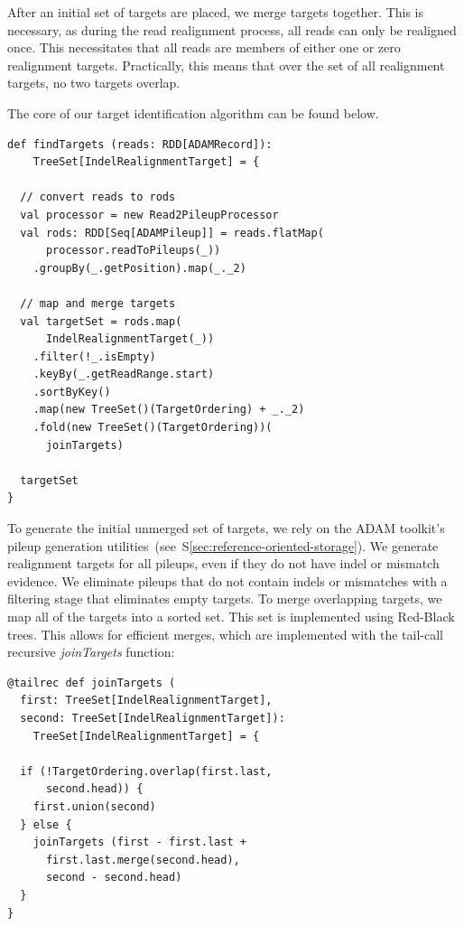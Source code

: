 \documentclass{acm_proc_article-sp}
\begin{document}
After an initial set of targets are placed, we merge targets together. This is necessary, as during the read realignment process, all
reads can only be realigned once. This necessitates that all reads are members of either one or zero realignment targets. Practically,
this means that over the set of all realignment targets, no two targets overlap.

The core of our target identification algorithm can be found below.

\begin{lstlisting}
def findTargets (reads: RDD[ADAMRecord]):
    TreeSet[IndelRealignmentTarget] = {

  // convert reads to rods
  val processor = new Read2PileupProcessor
  val rods: RDD[Seq[ADAMPileup]] = reads.flatMap(
      processor.readToPileups(_))
    .groupBy(_.getPosition).map(_._2)

  // map and merge targets
  val targetSet = rods.map(
      IndelRealignmentTarget(_))
    .filter(!_.isEmpty)
    .keyBy(_.getReadRange.start)
    .sortByKey()
    .map(new TreeSet()(TargetOrdering) + _._2)
    .fold(new TreeSet()(TargetOrdering))(
      joinTargets)

  targetSet
}
\end{lstlisting}

To generate the initial unmerged set of targets, we rely on the ADAM toolkit's pileup generation utilities~(see~\-S\ref{sec:reference-oriented-storage}).
We generate realignment targets for all pileups, even if they do not have indel or mismatch evidence. We eliminate pileups that do not contain indels
or mismatches with a filtering stage that eliminates empty targets. To merge overlapping targets, we map all of the targets into a sorted set. This set
is implemented using Red-Black trees. This allows for efficient merges, which are implemented with the tail-call recursive \emph{joinTargets} function:

\begin{lstlisting}
@tailrec def joinTargets (                                                                                                                                                               
  first: TreeSet[IndelRealignmentTarget],                                                                                                                                                                
  second: TreeSet[IndelRealignmentTarget]):
    TreeSet[IndelRealignmentTarget] = {

  if (!TargetOrdering.overlap(first.last,
      second.head)) {
    first.union(second)
  } else {
    joinTargets (first - first.last +
      first.last.merge(second.head),
      second - second.head)
  }
}
\end{lstlisting}
\end{document}
